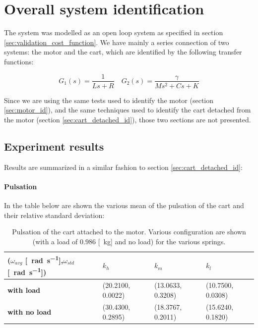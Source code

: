 \section{Overall system identification}
The system was modelled as an open loop system as specified in section \ref{sec:validation_cost_function}.
We have mainly  a series connection of two systems: the motor and the cart, which are identified by the following transfer functions:

$$G_1(s) = \frac{1}{Ls+R} \quad G_2(s) = \frac{\gamma}{Ms^2+Cs+K}$$

Since we are using the same tests used to identify the motor (section \ref{sec:motor_id}), and the same techniques used to identify the cart detached from the motor (section \ref{sec:cart_detached_id}), those two sections are not presented.
\subsection{Experiment results}
Results are summarized in a similar fashion to section \ref{sec:cart_detached_id}:
\paragraph{Pulsation}
In the table below are shown the various mean of the pulsation of the cart and their relative standard deviation:
\begin{table}[!h]
\centering

\label{table: cart_attached_omega}
\begin{tabular}{|l|l|l|l|}
\hline
{(\textbf{$\omega_{avg}$} [\SI{}{\radian \per \second}],$\omega_{std}$ [\SI{}{\radian \per \second}])} & \textbf{$k_h$} & \textbf{$k_m$}   & \textbf{$k_l$}   \\ \hline
\textbf{with load}         & (20.2100, 0.0022)    & (13.0633, 0.3208) & (10.7500, 0.0308)      \\ \hline
\textbf{with no load}      & (30.4300, 0.2895)    & (18.3767, 0.2011) & (15.6240, 0.1820) \\ \hline
\end{tabular}
\caption{Pulsation of the cart  attached to the motor. Various configuration are shown (with a load of $0.986$ [\SI{}{\kilo \gram}] and no load) for the various springs. }
\end{table} \\ \\



